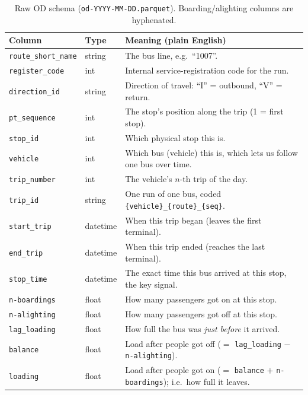\documentclass[final,5p,times,twocolumn,authoryear]{elsarticle}
\begin{document}
\begin{table}[t]
\centering
\small
\caption{Raw OD schema (\texttt{od-YYYY-MM-DD.parquet}). Boarding/alighting columns are hyphenated.}
\label{tab:od}
\begin{tabular}{P{2.9cm}P{1.4cm}P{8.6cm}}
\toprule
Column & Type & Meaning (plain English) \\
\midrule
\texttt{route\_short\_name} & string & The bus line, e.g.\ ``1007''. \\
\texttt{register\_code}     & int    & Internal service-registration code for the run. \\
\texttt{direction\_id}      & string & Direction of travel: ``I'' = outbound, ``V'' = return. \\
\texttt{pt\_sequence}       & int    & The stop's position along the trip (1 = first stop). \\
\texttt{stop\_id}           & int    & Which physical stop this is. \\
\texttt{vehicle}            & int    & Which bus (vehicle) this is, which lets us follow one bus over time. \\
\texttt{trip\_number}       & int    & The vehicle's $n$-th trip of the day. \\
\texttt{trip\_id}           & string & One run of one bus, coded \texttt{\{vehicle\}\_\{route\}\_\{seq\}}. \\
\texttt{start\_trip}        & datetime & When this trip began (leaves the first terminal). \\
\texttt{end\_trip}          & datetime & When this trip ended (reaches the last terminal). \\
\texttt{stop\_time}         & datetime & The exact time this bus arrived at this stop, the key signal. \\
\texttt{n-boardings}        & float  & How many passengers got on at this stop. \\
\texttt{n-alighting}        & float  & How many passengers got off at this stop. \\
\texttt{lag\_loading}       & float  & How full the bus was \emph{just before} it arrived. \\
\texttt{balance}            & float  & Load after people got off ($=$ \texttt{lag\_loading} $-$ \texttt{n-alighting}). \\
\texttt{loading}            & float  & Load after people got on ($=$ \texttt{balance} $+$ \texttt{n-boardings}); i.e.\ how full it leaves. \\
\bottomrule
\end{tabular}
\end{table}
\end{document}
